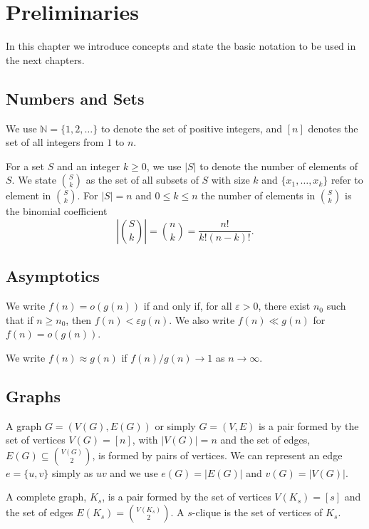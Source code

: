 \documentclass[12pt,twoside,a4paper,bibliography=totocnumbered]{book}
\numberwithin{equation}{section}
\theoremstyle{remark}
\begin{document}

\chapter{Preliminaries}
In this chapter we introduce concepts and state the basic notation to be used in the next chapters.

\section{Numbers and Sets}
We use $\mathbb{N} = \{1,2,\ldots\}$ to denote the set of positive integers, and $[n]$ denotes the set of all integers from $1$ to $n$. 

For a set $S$ and an integer $k \geq 0$, we use $|S|$ to denote the number of elements of $S$. We state $\binom{S}{k}$ as the set of all subsets of $S$ with size $k$ and $\{x_1,\ldots,x_k\}$ refer to element in $\binom{S}{k}$. For $|S| = n$ and $0 \leq k \leq n$ the number of elements in $\binom{S}{k}$ is the binomial coefficient
$$ \left| \binom{S}{k} \right| = \binom{n}{k} = \frac{n!}{k!(n-k)!}.$$
 
\section{Asymptotics}
We write $f(n) = o(g(n))$ if and only if, for all $\varepsilon > 0$, there exist $n_0$ such that if $n \geq n_0$, then $f(n) < \varepsilon g(n)$. We also write $f(n) \ll g(n)$ for $f(n) = o(g(n))$.

We write $f(n) \approx g(n)$ if $f(n)/g(n) \rightarrow 1$ as $n \rightarrow \infty$.

\section{Graphs}
A graph $G = (V(G), E(G))$ or simply $G = (V, E)$ is a pair formed by the set of vertices $V(G) = [n]$, with $|V(G)|=n$ and the set of edges, $E(G) \subseteq \binom{V(G)}{2}$, is formed by pairs of vertices. We can represent an edge $e = \{u,v\}$ simply as $uv$ and we use $e(G) = |E(G)|$ and $v(G) = |V(G)|$.

A complete graph, $K_s$, is a pair formed by the set of vertices $V(K_s) =  [s]$ and the set of edges $E(K_s) = \binom{V(K_s)}{2}$. A $s$-clique is the set of vertices of $K_s$.
\end{document}
